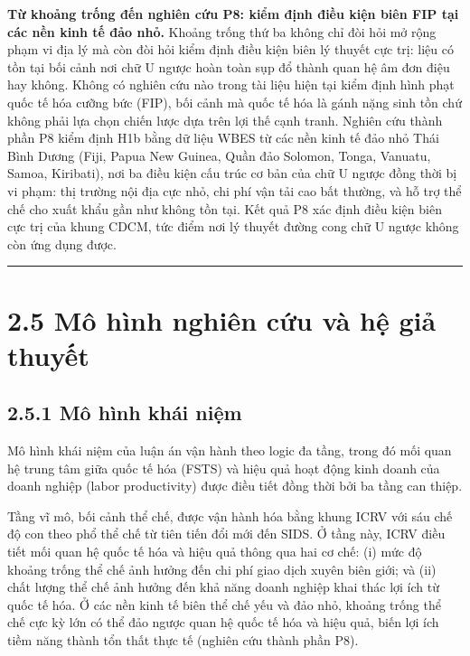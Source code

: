 \documentclass[
  a4paper,
  13pt]{extreport}
\begin{document}
\textbf{Từ khoảng trống đến nghiên cứu P8: kiểm định điều kiện biên FIP
tại các nền kinh tế đảo nhỏ.} Khoảng trống thứ ba không chỉ đòi hỏi mở
rộng phạm vi địa lý mà còn đòi hỏi kiểm định điều kiện biên lý thuyết
cực trị: liệu có tồn tại bối cảnh nơi chữ U ngược hoàn toàn sụp đổ thành
quan hệ âm đơn điệu hay không. Không có nghiên cứu nào trong tài liệu
hiện tại kiểm định hình phạt quốc tế hóa cưỡng bức (FIP), bối cảnh mà
quốc tế hóa là gánh nặng sinh tồn chứ không phải lựa chọn chiến lược dựa
trên lợi thế cạnh tranh. Nghiên cứu thành phần P8 kiểm định H1b bằng dữ
liệu WBES từ các nền kinh tế đảo nhỏ Thái Bình Dương (Fiji, Papua New
Guinea, Quần đảo Solomon, Tonga, Vanuatu, Samoa, Kiribati), nơi ba điều
kiện cấu trúc cơ bản của chữ U ngược đồng thời bị vi phạm: thị trường
nội địa cực nhỏ, chi phí vận tải cao bất thường, và hỗ trợ thể chế cho
xuất khẩu gần như không tồn tại. Kết quả P8 xác định điều kiện biên cực
trị của khung CDCM, tức điểm nơi lý thuyết đường cong chữ U ngược không
còn ứng dụng được.

\begin{center}\rule{0.5\linewidth}{0.5pt}\end{center}

\hypertarget{muxf4-huxecnh-nghiuxean-cux1ee9u-vuxe0-hux1ec7-giux1ea3-thuyux1ebft}{%
\section{2.5 Mô hình nghiên cứu và hệ giả
thuyết}\label{muxf4-huxecnh-nghiuxean-cux1ee9u-vuxe0-hux1ec7-giux1ea3-thuyux1ebft}}

\hypertarget{muxf4-huxecnh-khuxe1i-niux1ec7m}{%
\subsection{2.5.1 Mô hình khái
niệm}\label{muxf4-huxecnh-khuxe1i-niux1ec7m}}

Mô hình khái niệm của luận án vận hành theo logic đa tầng, trong đó mối
quan hệ trung tâm giữa quốc tế hóa (FSTS) và hiệu quả hoạt động kinh
doanh của doanh nghiệp (labor productivity) được điều tiết đồng thời bởi
ba tầng can thiệp.

Tầng vĩ mô, bối cảnh thể chế, được vận hành hóa bằng khung ICRV với sáu
chế độ con theo phổ thể chế từ tiên tiến đổi mới đến SIDS. Ở tầng này,
ICRV điều tiết mối quan hệ quốc tế hóa và hiệu quả thông qua hai cơ chế:
(i) mức độ khoảng trống thể chế ảnh hưởng đến chi phí giao dịch xuyên
biên giới; và (ii) chất lượng thể chế ảnh hưởng đến khả năng doanh
nghiệp khai thác lợi ích từ quốc tế hóa. Ở các nền kinh tế biên thể chế
yếu và đảo nhỏ, khoảng trống thể chế cực kỳ lớn có thể đảo ngược quan hệ
quốc tế hóa và hiệu quả, biến lợi ích tiềm năng thành tổn thất thực tế
(nghiên cứu thành phần P8).
\end{document}
